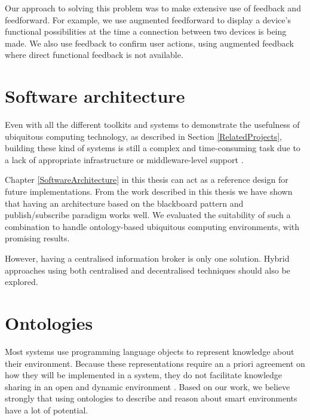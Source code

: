  Our approach to solving this problem was to make extensive use of feedback and feedforward. For example, we use augmented feedforward to display a device's functional possibilities at the time a connection between two devices is being made. We also use feedback to confirm user actions, using augmented feedback where direct functional feedback is not available.


\section{Software architecture}

Even with all the different toolkits and systems to demonstrate the usefulness of ubiquitous computing technology, as described in Section \ref{RelatedProjects}, building these kind of systems is still a complex and time-consuming task due to a lack of appropriate infrastructure or middle\-ware-level support \cite{Gu2004}.

Chapter \ref{SoftwareArchitecture} in this thesis can act as a reference design for future implementations. From the work described in this thesis we have shown that having an architecture based on the blackboard pattern and publish/subscribe paradigm works well. We evaluated the suitability of such a combination to handle ontology-based ubiquitous computing environments, with promising results.%

However, having a centralised information broker is only one solution. Hybrid approaches using both centralised and decentralised techniques should also be explored.   



\section{Ontologies}

Most systems use programming language objects to represent knowledge about their environment. Because these representations require an a priori agreement on how they will be implemented in a system, they do not facilitate knowledge sharing in an open and dynamic environment \cite{Chen2004}. Based on our work, we believe strongly that using ontologies to describe and reason about smart environments have a lot of potential.  
	

